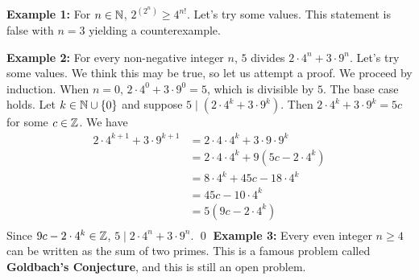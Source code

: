 \documentclass{article}
\begin{document}
\begin{examples}
  \textbf{Example 1:}\newline
  For $n \in \mathbb{N}$, $2^{(2^n)} \geq 4^{n!}$.
  Let's try some values.
  This statement is false with $n=3$ yielding a counterexample.

  \textbf{Example 2:}\newline
  For every non-negative integer $n$, $5$ divides $2 \cdot 4^n + 3 \cdot 9^n$. Let's try some values.
  We think this may be true, so let us attempt a proof.
  We proceed by induction. When $n=0$, $2 \cdot 4^0 + 3 \cdot 9^0 = 5$, which is divisible by $5$. The base case holds.
  Let $k \in \mathbb{N} \cup \{0\}$ and suppose $5 \mid (2 \cdot 4^k + 3 \cdot 9^k)$. Then $2 \cdot 4^k + 3 \cdot 9^k = 5c$ for some $c \in \mathbb{Z}$. We have
  \begin{align*}
    2 \cdot 4^{k+1} + 3 \cdot 9^{k+1} &= 2 \cdot 4 \cdot 4^{k} + 3 \cdot 9 \cdot 9^{k}\\
    &= 2 \cdot 4 \cdot 4^k + 9(5c - 2 \cdot 4^k)\\
    &= 8 \cdot 4^k + 45c - 18 \cdot 4^k\\
    &= 45c - 10 \cdot 4^k\\
    &= 5(9c - 2 \cdot 4^k)\\
  \end{align*}
  Since $9c - 2 \cdot 4^k \in \mathbb{Z}$, $5 \mid 2 \cdot 4^n + 3 \cdot 9^n$. \qed\newline
  \textbf{Example 3:}\newline
  Every even integer $n \geq 4$ can be written as the sum of two primes.
  This is a famous problem called \textbf{Goldbach's Conjecture}, and this is still an open problem.
\end{examples}
\end{document}
